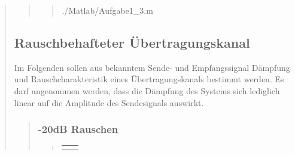 \begin{quote}
\begin{quote}
\begin{quote}
            
            
                {./Matlab/Aufgabe1_3.m}
            
        \end{quote}
        
        
    \end{quote}

    \subsection{Rauschbehafteter Übertragungskanal}
    
    Im Folgenden sollen aus bekanntem Sende- und Empfangssignal Dämpfung und Rauschcharakteristik
    eines Übertragungskanals bestimmt werden. Es darf angenommen werden, dass die Dämpfung des
    Systems sich lediglich linear auf die Amplitude des Sendesignals auswirkt.
    
    \begin{quote}
        
        \subsubsection{-20dB Rauschen}
        \begin{quote}
            
            
        \begin{center}
        \begin{tabular}{ll}
        
        \hspace{-16.5em}
            \begin{minipage}{0.6\textwidth}
                

\end{minipage}
\end{tabular}
\end{center}
\end{quote}
\end{quote}
\end{quote}
